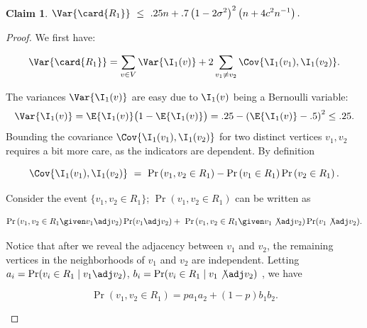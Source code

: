 \documentclass[11pt]{article}
\numberwithin{equation}{section}
\newtheorem{claim}[theorem]{Claim}
\theoremstyle{definition}
\theoremstyle{plain}
\begin{document}
			
			\begin{claim} \label{claim:day-1-covariance}
				$ \displaystyle
				\Var{\card{R_1}} \ \le \ .25n + .7\left(1 - 2\sigma^2\right)^2 \left(n + 4c^2n^{-1}\right).
				$
			\end{claim}
			
			\begin{proof}
				We first have:
				\begin{linenomath}\begin{equation*}
						\Var{\card{R_1}} = \sum_{v\in V}\Var{\I_1(v)} + 2\sum_{v_1\neq v_2}\Cov{\I_1(v_1), \I_1(v_2)}.
				\end{equation*}\end{linenomath}
				\noindent The variances $\Var{\I_1(v)}$ are easy due to $\I_1(v)$ being a  Bernoulli variable:
				\begin{equation} \label{eq:day-1-variance}
					\Var{\I_1(v)} = \E{\I_1(v)}\bigl(1 - \E{\I_1(v)}\bigr) = .25 - \left(\E{\I_1(v)} - .5\right)^2
					\le .25.
				\end{equation}
				Bounding the covariance $\Cov{\I_1(v_1), \I_1(v_2)}$ for two distinct vertices $v_1, v_2$ requires a bit more care, as the indicators are dependent.
				By definition
				\begin{linenomath}\begin{equation*}
						\Cov{\I_1(v_1), \I_1(v_2)} \ = \ \Pr\left(v_1, v_2 \in R_1\right) - \Pr\left(v_1 \in R_1\right) \Pr\left(v_2 \in R_1\right).
				\end{equation*}\end{linenomath}
				Consider the event $\{v_1, v_2 \in R_1\}$;  $\Pr\left(v_1, v_2 \in R_1\right)$ can be written as
				\begin{linenomath}\begin{equation*}
						\Pr\left(v_1, v_2 \in R_1 \given v_1 \adj v_2\right)\Pr(v_1 \adj v_2) + \ \Pr\left(v_1, v_2 \in R_1 \given v_1 \not\adj v_2\right)\Pr(v_1 \not\adj v_2).
				\end{equation*}\end{linenomath}
				Notice  that after we reveal the adjacency between $v_1$ and $v_2$, the remaining vertices in the neighborhoods of $v_1$ and $v_2$ are independent. Letting $a_i = \Pr(v_i\in R_1\mid v_1\adj v_2)$, $b_i = \Pr(v_i\in R_1\mid v_1\not\adj v_2)$ %
				, we have
				\begin{linenomath}\begin{equation*}
						\Pr\left(v_1, v_2 \in R_1\right) =  pa_1a_2 + (1 - p)b_1b_2.

\end{equation*}
\end{linenomath}
\end{proof}
\end{document}

